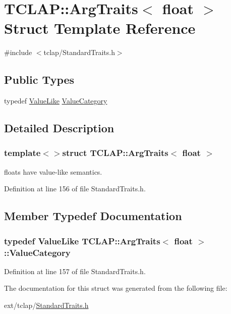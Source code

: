 \hypertarget{struct_t_c_l_a_p_1_1_arg_traits_3_01float_01_4}{}\section{T\+C\+L\+A\+P\+:\+:Arg\+Traits$<$ float $>$ Struct Template Reference}
\label{struct_t_c_l_a_p_1_1_arg_traits_3_01float_01_4}


{\ttfamily \#include $<$tclap/\+Standard\+Traits.\+h$>$}

\subsection*{Public Types}
\begin{DoxyCompactItemize}
\item 
typedef \hyperlink{struct_t_c_l_a_p_1_1_value_like}{Value\+Like} \hyperlink{struct_t_c_l_a_p_1_1_arg_traits_3_01float_01_4_ace983d74b1b28caa692840da15313acf}{Value\+Category}
\end{DoxyCompactItemize}


\subsection{Detailed Description}
\subsubsection*{template$<$$>$struct T\+C\+L\+A\+P\+::\+Arg\+Traits$<$ float $>$}

floats have value-\/like semantics. 

Definition at line 156 of file Standard\+Traits.\+h.



\subsection{Member Typedef Documentation}
\hypertarget{struct_t_c_l_a_p_1_1_arg_traits_3_01float_01_4_ace983d74b1b28caa692840da15313acf}{}
\subsubsection[{Value\+Category}]{\setlength{\rightskip}{0pt plus 5cm}typedef {\bf Value\+Like} {\bf T\+C\+L\+A\+P\+::\+Arg\+Traits}$<$ float $>$\+::{\bf Value\+Category}}\label{struct_t_c_l_a_p_1_1_arg_traits_3_01float_01_4_ace983d74b1b28caa692840da15313acf}


Definition at line 157 of file Standard\+Traits.\+h.



The documentation for this struct was generated from the following file\+:\begin{DoxyCompactItemize}
\item 
ext/tclap/\hyperlink{_standard_traits_8h}{Standard\+Traits.\+h}\end{DoxyCompactItemize}
